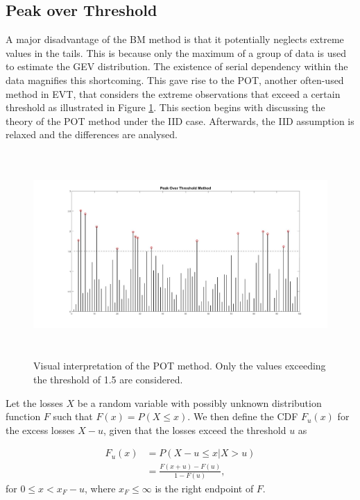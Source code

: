 \documentclass[a4paper,12pt]{article}
\theoremstyle{plain}
\begin{document}
\subsection{Peak over Threshold}
A major disadvantage of the BM method is that it potentially neglects extreme values in the tails. This is because only the maximum of a group of data is used to estimate the GEV distribution. The existence of serial dependency within the data magnifies this shortcoming. This gave rise to the POT, another often-used method in EVT, that considers the extreme observations that exceed a certain threshold as illustrated in Figure \ref{fig:peakoverthreshold}. This section begins with discussing the theory of the POT method under the IID case. Afterwards, the IID assumption is relaxed and the differences are analysed. \\

\begin{figure}[H]
\includegraphics[height=7.8cm, width=\linewidth]{Figures/peakoverthreshold_example2.jpg} 
\vspace{-0.8cm}
\captionsetup[figure]{font=small,labelfont=small}
\caption{Visual interpretation of the POT method. Only the values exceeding the threshold of 1.5 are considered.}
\label{fig:peakoverthreshold}
\end{figure}

Let the losses $X$ be a random variable with possibly unknown distribution function $F$ such that $F(x) = P(X \leq x)$. We then define the CDF $F_u(x)$ for the excess losses $X-u$, given that the losses exceed the threshold $u$ as 

\begin{equation}
    \begin{split}
        F_u(x) &= P(X-u\leq x| X > u)\\
        & = \frac{F(x+u) - F(u)}{1 - F(u)},
    \end{split}
\end{equation}
for $0\leq x < x_F - u$, where $x_F\leq \infty$ is the right endpoint of $F$.\\
\end{document}
